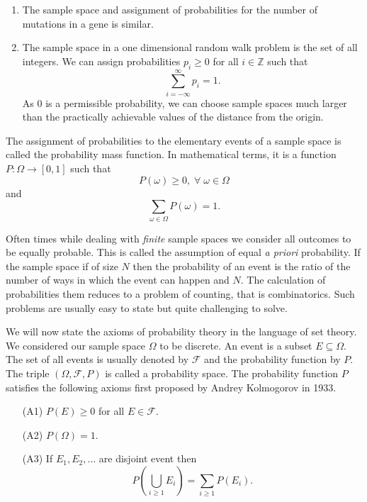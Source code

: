 \documentclass{article}
\begin{document}
\begin{enumerate}
\item The sample space and assignment of probabilities for the number of
mutations in a gene is similar.

\item The sample space in a one dimensional random walk problem is the
set of all integers. We can assign probabilities $p_i \ge 0$ for all $i
\in \mathbb{Z}$ such that 
\begin{equation}\label{e9}
\sum_{i=-\infty}^{\infty} p_i = 1.
\end{equation}
As $0$ is a permissible probability, we can choose sample spaces much 
larger than the practically achievable values of the distance from the 
origin.
\end{enumerate}

The assignment of probabilities to the elementary events of a sample space
is called the probability mass function. In mathematical terms, it is a
function $P: \Omega \rightarrow [0, 1]$ such that
\begin{equation}\label{e10}
P(\omega) \ge 0, \;\forall\; \omega \in \Omega
\end{equation}
and
\begin{equation}\label{e11}
\sum_{\omega \in \Omega}P(\omega) = 1.
\end{equation}

Often times while dealing with \emph{finite} sample spaces we consider all
outcomes to be equally probable. This is called the assumption of equal
\emph{a priori} probability. If the sample space if of size $N$ then the
probability of an event is the ratio of the number of ways in which the 
event can happen and $N$. The calculation of probabilities them reduces to
a problem of counting, that is combinatorics. Such problems are usually
easy to state but quite challenging to solve.

We will now state the axioms of probability theory in the language of set
theory. We considered our sample space $\Omega$ to be discrete. An event
is a subset $E \subseteq \Omega$. The set of all events is usually denoted
by $\mathcal{F}$ and the probability function by $P$. The triple $(\Omega,
\mathcal{F}, P)$ is called a probability space. The probability function
$P$ satisfies the following axioms first proposed by Andrey Kolmogorov
in 1933.
\begin{enumerate}
\item[(A1)] $P(E) \ge 0$ for all $E \in \mathcal{F}$.
\item[(A2)] $P(\Omega) = 1$.
\item[(A3)] If $E_1, E_2, \ldots$ are disjoint event then
\begin{equation}\label{e12}
P\left(\bigcup_{i \ge 1} E_i\right) = \sum_{i \ge 1}P(E_i).
\end{equation}
\end{enumerate}
\end{document}
